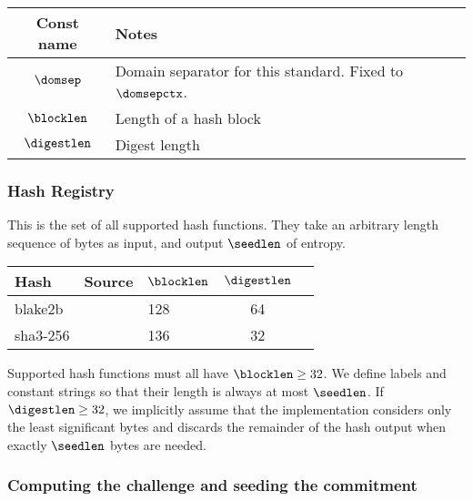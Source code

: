 \documentclass[11pt]{article}
\begin{document}
\begin{center}
\begin{tabular}{cl}
  Const name & Notes \\
  \hline
  $\domsep$ & Domain separator for this standard. Fixed to $\domsepctx$.   \\
  $\blocklen$ & Length of a hash block \\
  $\digestlen$ & Digest length
\end{tabular}
\end{center}

\subsubsection{Hash Registry}
\label{sec:hash-registry}

This is the set of all supported hash functions. They take an arbitrary length sequence of bytes as input, and output $\seedlen$ of entropy.

\begin{center}
  \begin{tabular}{lllcc}
  Hash  & Source & $\blocklen$ & $\digestlen$ \\
  \hline
  blake2b &  \cite{ACNS:ANWW13} & 128 & 64 \\
  sha3-256 & \cite{EC:BDPA13} & 136 & 32 \\
  \end{tabular}
\end{center}
Supported hash functions must all have $\blocklen \geq 32$. We define labels and constant strings so that their length is always at most $\seedlen$.
If $\digestlen \ge 32$, we implicitly assume that the implementation considers only the least significant bytes and discards the remainder of the hash output when exactly $\seedlen$ bytes are needed.
\subsubsection{Computing the challenge and seeding the commitment}
\label{sec:fs-challenge}
\end{document}

